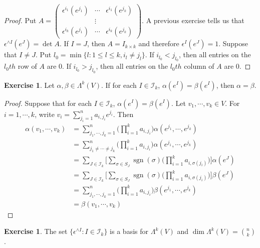 \documentclass{book}
\theoremstyle{definition}
\newtheorem{ex}[definition]{Exercise}
\newcommand{\al}{\alpha}
\newcommand{\be}{\beta}
\newcommand{\ep}{\epsilon}
\newcommand{\sig}{\sigma}
\newcommand{\Lam}{\Lambda}
\newcommand{\MI}{\mathcal{I}}
\DeclareMathOperator{\sgn}{sgn}
\DeclareMathOperator*{\0}{\mbf{0}}
\DeclareMathOperator*{\1}{\mbf{1}}
\begin{document}
	\begin{proof}
		Put $A = \begin{pmatrix}
			\ep^{i_1}(e^{j_1}) & \cdots & \ep^{i_1}(e^{j_k}) \\
			& \vdots & \\
			\ep^{i_k}(e^{j_1}) & \cdots & \ep^{i_k}(e^{j_k}) 
		\end{pmatrix}$.
		A previous exercise tells us that $\ep^{\wedge I} (e^J) = \det A$.
		If $I = J$, then $A = I_{k\times k}$ and therefore $\ep^I(e^J) = 1$. Suppose that $I \neq J$. Put $l_0 = \min \{l: 1 \leq l \leq k, i_l \neq j_l\}$. If $i_{l_0} < j_{l_0}$, then all entries on the $l_0th$ row of $A$ are $0$. If $i_{l_0} > j_{l_0}$, then all entries on the $l_0th$ column of $A$ are $0$.
	\end{proof}

	\begin{ex}
		Let $\al , \be \in \Lam^k(V)$. If for each $I \in \MI_k$, $\al(e^I) = \be(e^I)$, then $\al = \be$.
	\end{ex}

	\begin{proof}
		Suppose that for each $I \in \MI_k$, $\al(e^I) = \be(e^I)$. Let $v_1, \cdots, v_k \in V$. For $i = 1, \cdots, k$, write $v_i = \sum_{j_i = 1}^n a_{i,j_i}e^{j_i}$. Then 
		\begin{align*}
			\al(v_1, \cdots, v_k) 
			&= \sum_{j_1, \cdots, j_k =1}^n \bigg( \prod_{i=1}^k a_{i, j_i} \bigg) \al(e^{j_1}, \cdots, e^{j_k}) \\
			&= \sum_{j_1 \neq \cdots \neq j_k}^n \bigg( \prod_{i=1}^k a_{i, j_i} \bigg) \al(e^{j_1}, \cdots, e^{j_k}) \\
			&= \sum_{J \in \MI_k} \bigg [ \sum_{\sig \in S_J} \sgn(\sig) \bigg( \prod_{i=1}^k a_{i, \sig(j_i)} \bigg) \bigg] \al(e^J) \\
			&= \sum_{J \in \MI_k} \bigg [ \sum_{\sig \in S_J} \sgn(\sig) \bigg( \prod_{i=1}^k a_{i, \sig(j_i)} \bigg) \bigg] \be(e^J) \\
			&= \sum_{j_1, \cdots, j_k =1}^n \bigg( \prod_{i=1}^k a_{i, j_i} \bigg) \be(e^{j_1}, \cdots, e^{j_k}) \\
			&= \be(v_1, \cdots, v_k) 
		\end{align*}
	
	\end{proof}

	\begin{ex}
		The set $\{\ep^{\wedge I} : I \in \MI_k\}$ is a basis for $\Lam^k(V)$ and $\dim \Lam^k(V) = {n \choose k}$.
	\end{ex}
\end{document}
